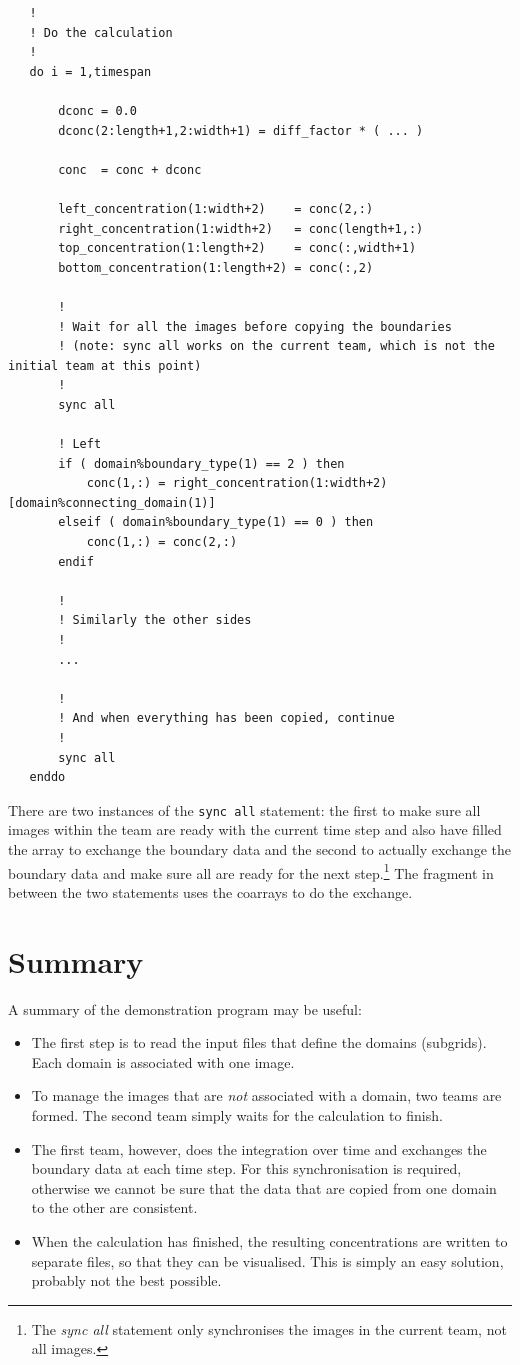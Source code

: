 \documentclass[onecolumn]{article}
\begin{document}
\begin{lstlisting}
   !
   ! Do the calculation
   !
   do i = 1,timespan

       dconc = 0.0
       dconc(2:length+1,2:width+1) = diff_factor * ( ... )

       conc  = conc + dconc

       left_concentration(1:width+2)    = conc(2,:)
       right_concentration(1:width+2)   = conc(length+1,:)
       top_concentration(1:length+2)    = conc(:,width+1)
       bottom_concentration(1:length+2) = conc(:,2)

       !
       ! Wait for all the images before copying the boundaries
       ! (note: sync all works on the current team, which is not the initial team at this point)
       !
       sync all

       ! Left
       if ( domain%boundary_type(1) == 2 ) then
           conc(1,:) = right_concentration(1:width+2)[domain%connecting_domain(1)]
       elseif ( domain%boundary_type(1) == 0 ) then
           conc(1,:) = conc(2,:)
       endif

       !
       ! Similarly the other sides
       !
       ...

       !
       ! And when everything has been copied, continue
       !
       sync all
   enddo
\end{lstlisting}

There are two instances of the \verb+sync all+ statement: the first to make sure all images within the team are ready with the current
time step and also have filled the array to exchange the boundary data and the second to actually exchange the boundary data and
make sure all are ready for the next step.\footnote{The \emph{sync all} statement only synchronises the images in the current team, not all images.}
The fragment in between the two statements uses the coarrays to do the exchange.


\section{Summary}
A summary of the demonstration program may be useful:
\begin{itemize}
\item
The first step is to read the input files that define the domains (subgrids). Each domain is associated with one image.
\item
To manage the images that are \emph{not} associated with a domain, two teams are formed. The second team simply waits for the calculation
to finish.
\item
The first team, however, does the integration over time and exchanges the boundary data at each time step. For this synchronisation is
required, otherwise we cannot be sure that the data that are copied from one domain to the other are consistent.
\item
When the calculation has finished, the resulting concentrations are written to separate files, so that they can be visualised. This is
simply an easy solution, probably not the best possible.
\end{itemize}
\end{document}
